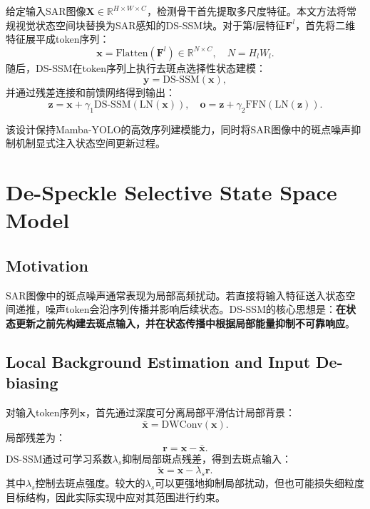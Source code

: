 \documentclass[UTF8,zihao=-4]{ctexart}
\begin{document}
给定输入SAR图像$\mathbf{X}\in\mathbb{R}^{H\times W\times C}$，检测骨干首先提取多尺度特征。本文方法将常规视觉状态空间块替换为SAR感知的DS-SSM块。对于第$l$层特征$\mathbf{F}^{l}$，首先将二维特征展平成token序列：
\begin{equation}
  \mathbf{x} = \mathrm{Flatten}(\mathbf{F}^{l}) \in \mathbb{R}^{N\times C}, \quad N=H_l W_l .
\end{equation}
随后，DS-SSM在token序列上执行去斑点选择性状态建模：
\begin{equation}
  \mathbf{y} = \mathrm{DS\mbox{-}SSM}(\mathbf{x}),
\end{equation}
并通过残差连接和前馈网络得到输出：
\begin{equation}
  \mathbf{z} = \mathbf{x} + \gamma_1 \mathrm{DS\mbox{-}SSM}(\mathrm{LN}(\mathbf{x})), \quad
  \mathbf{o} = \mathbf{z} + \gamma_2 \mathrm{FFN}(\mathrm{LN}(\mathbf{z})).
\end{equation}

该设计保持Mamba-YOLO的高效序列建模能力，同时将SAR图像中的斑点噪声抑制机制显式注入状态空间更新过程。

\section{De-Speckle Selective State Space Model}

\subsection{Motivation}

SAR图像中的斑点噪声通常表现为局部高频扰动。若直接将输入特征送入状态空间递推，噪声token会沿序列传播并影响后续状态。DS-SSM的核心思想是：\textbf{在状态更新之前先构建去斑点输入，并在状态传播中根据局部能量抑制不可靠响应}。

\subsection{Local Background Estimation and Input De-biasing}

对输入token序列$\mathbf{x}$，首先通过深度可分离局部平滑估计局部背景：
\begin{equation}
  \bar{\mathbf{x}} = \mathrm{DWConv}(\mathbf{x}).
\end{equation}
局部残差为：
\begin{equation}
  \mathbf{r} = \mathbf{x} - \bar{\mathbf{x}} .
\end{equation}
DS-SSM通过可学习系数$\lambda_s$抑制局部斑点残差，得到去斑点输入：
\begin{equation}
  \widetilde{\mathbf{x}} = \mathbf{x} - \lambda_s \mathbf{r}.
\end{equation}
其中$\lambda_s$控制去斑点强度。较大的$\lambda_s$可以更强地抑制局部扰动，但也可能损失细粒度目标结构，因此实际实现中应对其范围进行约束。
\end{document}
